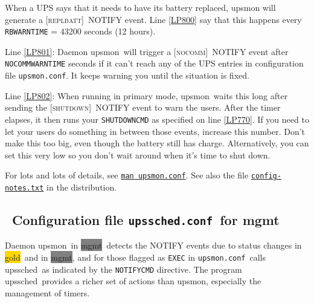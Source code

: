 \documentclass[12pt]{article}
\newlength{\headersep}\setlength{\headersep}{3mm}
\newcommand{\Hsep}{\hspace{\headersep}}
\newcommand{\upsmon}{\mbox{\textcolor{MONCOLOUR}{upsmon}}}
\newcommand{\upssched}{\mbox{\textcolor{SCHEDCOLOUR}{upssched}}}
\newcommand{\gold}[1][gold]{\colorbox{GOLD}{#1}}
\newcommand{\mgmt}[1][mgmt]{\colorbox{GRAY}{#1}}
\newcommand{\SHUTDOWN}{\textcolor{MONCOLOUR}{\textsc{shutdown}}}
\newcommand{\REPLBATT}{\textcolor{MONCOLOUR}{\textsc{replbatt}}}
\newcommand{\NOCOMM}{\textcolor{MONCOLOUR}{\textsc{nocomm}}}
\newcommand{\NOTev}[1]{\textcolor{MONCOLOUR}{[{#1}]}}
\newcommand{\upsmonconf}{\textcolor{MONCOLOUR}{\texttt{upsmon.conf}}}
\newcommand{\upsschedconf}{\textcolor{SCHEDCOLOUR}{\texttt{upssched.conf}}}
\newcommand{\NUTman}[1]{\href{https://networkupstools.org/docs/man/#1.html}{\texttt{man #1}}}
\begin{document}
When a UPS says that it needs to have its battery replaced, upsmon will
generate a \NOTev{\REPLBATT}\ NOTIFY event.  Line \ref{LP800} say that this happens
every \texttt{RBWARNTIME} = 43200 seconds (12 hours).

Line \ref{LP801}: Daemon \upsmon\ will trigger a \NOTev{\NOCOMM}\ NOTIFY event after
\texttt{NOCOMMWARNTIME} seconds if it can't reach any of the UPS entries in
configuration file \upsmonconf.  It keeps warning you until the situation is
fixed.

Line \ref{LP802}: When running in primary mode, \upsmon\ waits this
long after sending the \NOTev{\SHUTDOWN}\ NOTIFY event to warn the
users. After the timer elapses, it then runs your \texttt{SHUTDOWNCMD}
as specified on line \ref{LP770}.  If you need to let your users do
something in between those events, increase this number. Don't make
this too big, even though the battery still has charge.
Alternatively, you can set this very low so you don't wait around when
it's time to shut down.

For lots and lots of details, see \NUTman{upsmon.conf}.  See also the file
\href{https://github.com/networkupstools/nut/blob/master/docs/config-notes.txt}
     {\texttt{config{\allowbreak}-notes.txt}} in the distribution.

\subsection{\Hsep\ Configuration file \upsschedconf\ for mgmt}\label{section:upsschedconf.big}

Daemon \upsmon\ in \mgmt\ detects the NOTIFY events due to status
changes in \gold\ and in \mgmt, and for those flagged as \texttt{EXEC}
in \upsmonconf\ calls \upssched\ as indicated by the
\texttt{NOTIFYCMD} directive.  The program \upssched\ provides a
richer set of actions than \upsmon, especially the management of
timers.
\end{document}
